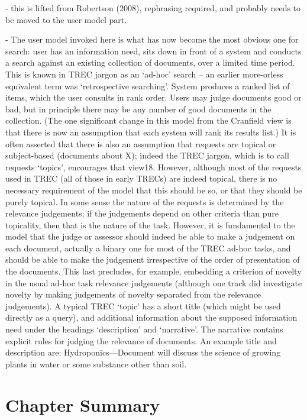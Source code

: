 - this is lifted from Robertson (2008), rephrasing required, and probably needs to be moved to the user model part.

- The user model invoked here is what has now become the most obvious one for search: user has an
information need, sits down in front of a system and conducts a search against an existing collection of
documents, over a limited time period. This is known in TREC jargon as an ‘ad-hoc’ search – an earlier more-orless
equivalent term was ‘retrospective searching’. System produces a ranked list of items, which the user consults
in rank order. Users may judge documents good or bad, but in principle there may be any number of good
documents in the collection. (The one significant change in this model from the Cranfield view is that there is now
an assumption that each system will rank its results list.) It is often asserted that there is also an assumption that
requests are topical or subject-based (documents about X); indeed the TREC jargon, which is to call requests
‘topics’, encourages that view18. However, although most of the requests used in TREC (all of those in early
TRECs) are indeed topical, there is no necessary requirement of the model that this should be so, or that they
should be purely topical. In some sense the nature of the requests is determined by the relevance judgements; if
the judgements depend on other criteria than pure topicality, then that is the nature of the task.
However, it is fundamental to the model that the judge or assessor should indeed be able to make a judgement
on each document, actually a binary one for most of the TREC ad-hoc tasks, and should be able to make the
judgement irrespective of the order of presentation of the documents. This last precludes, for example, embedding
a criterion of novelty in the usual ad-hoc task relevance judgements (although one track did investigate novelty by
making judgements of novelty separated from the relevance judgements). A typical TREC ‘topic’ has a short title (which might be used directly as a query), and additional information about the
supposed information need under the headings ‘description’ and ‘narrative’. The narrative contains explicit rules for
judging the relevance of documents. An example title and description are: Hydroponics—Document will discuss the
science of growing plants in water or some substance other than soil. 

\section{Chapter Summary}



